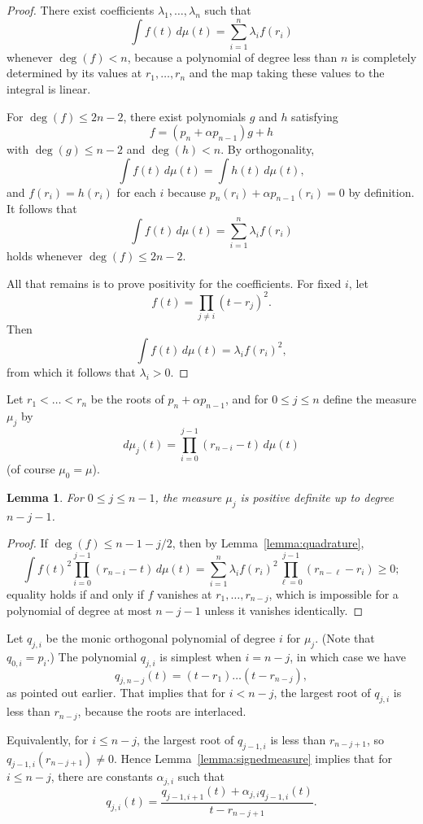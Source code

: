 \documentclass{jams-l}
\theoremstyle{plain}
\newtheorem{lemma}[theorem]{Lemma}
\numberwithin{theorem}{section}
\theoremstyle{definition}
\numberwithin{equation}{section}
\begin{document}
\begin{proof}
There exist coefficients $\lambda_1,\dots,\lambda_n$ such that
$$
\int f(t) \,d\mu(t) = \sum_{i=1}^n \lambda_i f(r_i)
$$
whenever $\deg(f)<n$, because a polynomial of degree less than $n$
is completely determined by its values at $r_1,\dots,r_n$ and the
map taking these values to the integral is linear.

For $\deg(f) \le 2n-2$, there exist polynomials $g$ and $h$
satisfying 
$$f = (p_n+\alpha p_{n-1})g + h$$ with $\deg(g) \le n-2$
and $\deg(h) < n$.  By orthogonality,
$$
\int f(t) \,d\mu(t) = \int h(t) \,d\mu(t),
$$
and $f(r_i) = h(r_i)$ for each $i$ because $p_n(r_i) + \alpha
p_{n-1}(r_i)=0$ by definition.  It follows that
$$
\int f(t) \,d\mu(t) = \sum_{i=1}^n \lambda_i f(r_i)
$$
holds whenever $\deg(f) \le 2n-2$.

All that remains is to prove positivity for the coefficients.  For
fixed $i$, let
$$
f(t) = \prod_{j \ne i} (t-r_j)^2.
$$
Then
$$
\int f(t) \,d\mu(t) = \lambda_i f(r_i)^2,
$$
from which it follows that $\lambda_i>0$.
\end{proof}

Let $r_1 < \dots < r_n$ be the roots of $p_n + \alpha p_{n-1}$,
and for $0 \le j \le n$ define the measure $\mu_j$ by
$$
d\mu_j(t) = \prod_{i=0}^{j-1} (r_{n-i}-t) \, d\mu(t)
$$
(of course $\mu_0=\mu$).

\begin{lemma} \label{lemma:posdefbd}
For $0 \le j \le n-1$, the measure $\mu_j$ is positive definite up
to degree $n-j-1$.
\end{lemma}

\begin{proof}
If $\deg(f) \le n-1-j/2$, then by Lemma~\ref{lemma:quadrature},
$$
\int f(t)^2 \prod_{i=0}^{j-1} (r_{n-i}-t) \, d\mu(t) =
\sum_{i=1}^n \lambda_i f(r_i)^2 \prod_{\ell=0}^{j-1}
(r_{n-\ell}-r_i) \ge 0;
$$
equality holds if and only if $f$ vanishes at $r_1,\dots,r_{n-j}$,
which is impossible for a polynomial of degree at most $n-j-1$
unless it vanishes identically.
\end{proof}

Let $q_{j,i}$ be the monic orthogonal polynomial of degree $i$ for
$\mu_j$.  (Note that $q_{0,i} = p_i$.)  The polynomial $q_{j,i}$
is simplest when $i=n-j$, in which case we have
$$
q_{j,n-j}(t) = (t-r_1) \dots (t-r_{n-j}),
$$
as pointed out earlier. That implies that for $i < n-j$, the
largest root of $q_{j,i}$ is less than $r_{n-j}$, because the
roots are interlaced.

Equivalently, for $i \le n-j$, the largest root of $q_{j-1,i}$ is
less than $r_{n-j+1}$, so $q_{j-1,i}(r_{n-j+1}) \ne 0$.  Hence
Lemma~\ref{lemma:signedmeasure} implies that for $i \le n-j$,
there are constants $\alpha_{j,i}$ such that
$$
q_{j,i}(t) = \frac{q_{j-1,i+1}(t) + \alpha_{j,i}
q_{j-1,i}(t)}{t-r_{n-j+1}}.
$$
\end{document}
